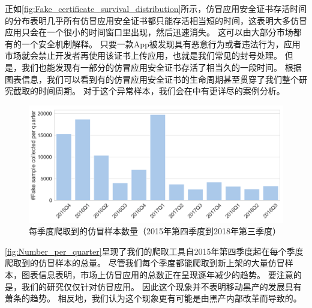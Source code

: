 正如\autoref{fig:Fake_certificate_survival_distribution}所示，仿冒应用安全证书存活时间的分布表明几乎所有仿冒应用安全证书都只能存活相当短的时间，这表明大多仿冒应用只会在一个很小的时间窗口里出现，然后迅速消失。
这可以由大部分市场都有的一个安全机制解释。
只要一款App被发现具有恶意行为或者违法行为，应用市场就会禁止开发者再使用该证书上传应用，也就是我们常见的封号处理。
但是，我们也能发现有一部分的仿冒应用安全证书存活了相当久的一段时间。
根据图表信息，我们可以看到有的仿冒应用安全证书的生命周期甚至贯穿了我们整个研究截取的时间周期。
对于这个异常样本，我们会在中有更详尽的案例分析。

\begin{figure}[htbp]
	\centering
	\includegraphics[width=\textwidth]{./Figures/edwin-Number_of_samples_collected_per_quarter_3.png}
	\caption{每季度爬取到的仿冒样本数量（2015年第四季度到2018年第三季度）}
	\label{fig:Number_per_quarter}
\end{figure}

\autoref{fig:Number_per_quarter}呈现了我们的爬取工具自2015年第四季度起在每个季度爬取到的仿冒样本的总量。
尽管我们每个季度都能爬取到新上架的大量仿冒样本，图表信息表明，市场上仿冒应用的总数正在呈现逐年减少的趋势。
要注意的是，我们的研究仅仅针对仿冒应用。
因此这个现象并不表明移动黑产的发展具有萧条的趋势。
相反地，我们认为这个现象更有可能是由黑产内部改革而导致的。

